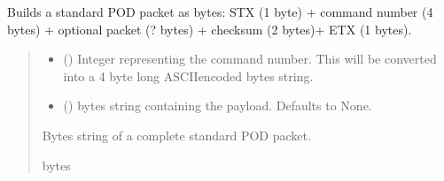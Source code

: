 \documentclass[letterpaper,10pt,english]{sphinxmanual}
\begin{document}
\begin{fulllineitems}
\begin{fulllineitems}
\label{\detokenize{PodPacketHandling:PodPacketHandling.POD_Packets.BuildPODpacket_Standard}}
\pysigstartsignatures
{}
\pysigstopsignatures
\sphinxAtStartPar
Builds a standard POD packet as bytes: STX (1 byte) + command number (4 bytes)         + optional packet (? bytes) + checksum (2 bytes)+ ETX (1 bytes).
\begin{quote}\begin{description}
\begin{itemize}
\item {} 
\sphinxAtStartPar
{} () \textendash{} Integer representing the command number. This will be converted into                 a 4 byte long ASCII\sphinxhyphen{}encoded bytes string.

\item {} 
\sphinxAtStartPar
{} (\sphinxstyleliteralemphasis{\sphinxupquote{ | }}\sphinxstyleliteralemphasis{\sphinxupquote{, }}) \textendash{} bytes string containing the payload. Defaults to None.

\end{itemize}

\sphinxAtStartPar
Bytes string of a complete standard POD packet.

\sphinxAtStartPar
bytes

\end{description}\end{quote}

\end{fulllineitems}



\end{fulllineitems}
\end{document}
